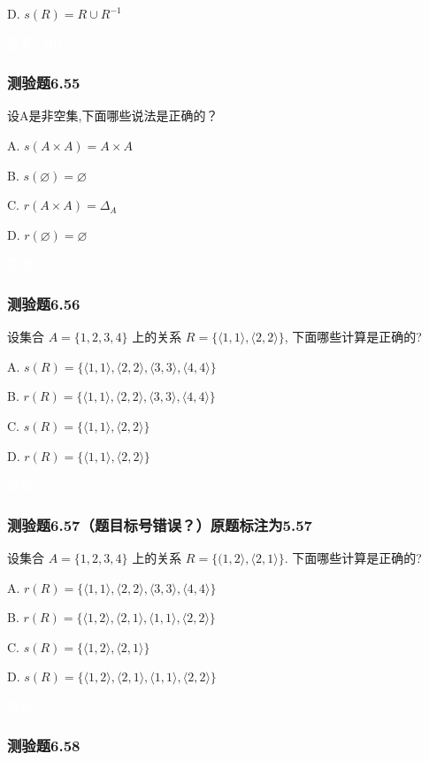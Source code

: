 \documentclass[UTF8, heading=true]{ctexart}
\begin{document}
D. $s(R)=R \cup R^{-1}$

\textcolor{white}{答案：BD}

\subsubsection{测验题6.55}
设A是非空集,下面哪些说法是正确的？

A. $s(A \times A)=A \times A$

B. $s(\varnothing)=\varnothing$

C. $r(A \times A)=\Delta_A$

D. $r(\varnothing)=\varnothing$

\textcolor{white}{答案：AB}

\subsubsection{测验题6.56}

设集合 $A=\{1,2,3,4\}$ 上的关系 $R=\{\langle 1,1\rangle,\langle 2,2\rangle\}$, 下面哪些计算是正确的?

A. $s(R)=\{\langle 1,1\rangle,\langle 2,2\rangle,\langle 3,3\rangle,\langle 4,4\rangle\}$

B. $r(R)=\{\langle 1,1\rangle,\langle 2,2\rangle,\langle 3,3\rangle,\langle 4,4\rangle\}$

C. $s(R)=\{\langle 1,1\rangle,\langle 2,2\rangle\}$

D. $r(R)=\{\langle 1,1\rangle,\langle 2,2\rangle\}$

\textcolor{white}{答案：BC}

\subsubsection{测验题6.57（题目标号错误？）原题标注为5.57}
设集合 $A=\{1,2,3,4\}$ 上的关系 $R=\{(1,2\rangle,\langle 2,1\rangle\}$. 下面哪些计算是正确的?

A. 
$
r(R)=\{\langle 1,1\rangle,\langle 2,2\rangle,\langle 3,3\rangle,\langle 4,4\rangle\}
$

B. 
$
r(R)=\{\langle 1,2\rangle,\langle 2,1\rangle,\langle 1,1\rangle,\langle 2,2\rangle\}
$

C. 
$
s(R)=\{\langle 1,2\rangle,\langle 2,1\rangle\}
$

D. 
$
s(R)=\{\langle 1,2\rangle,\langle 2,1\rangle,\langle 1,1\rangle,\langle 2,2\rangle\}
$

\textcolor{white}{答案：C}

\subsubsection{测验题6.58}
\end{document}
